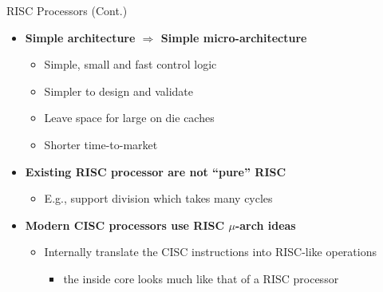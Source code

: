 \documentclass[aspectratio=169,12pt]{beamer}
\begin{document}
\begin{frame}{RISC Processors (Cont.)}
\begin{itemize}
    \item \textbf{Simple architecture $\Rightarrow$ Simple micro-architecture}
    \begin{itemize}
        \item Simple, small and fast control logic
        \item Simpler to design and validate
        \item Leave space for large on die caches
        \item Shorter time-to-market
    \end{itemize}
    \vspace{0.3cm}
    \item \textbf{Existing RISC processor are not ``pure'' RISC}
    \begin{itemize}
        \item E.g., support division which takes many cycles
    \end{itemize}
    \vspace{0.3cm}
    \item \textbf{Modern CISC processors use RISC $\mu$-arch ideas}
    \begin{itemize}
        \item Internally translate the CISC instructions into RISC-like operations
        \begin{itemize}
            \item the inside core looks much like that of a RISC processor
        \end{itemize}
    \end{itemize}
\end{itemize}
\end{frame}
\end{document}
